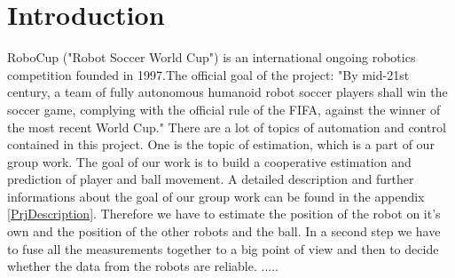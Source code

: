 
\chapter{Introduction}
RoboCup ("Robot Soccer World Cup") is an international ongoing robotics competition founded in 1997.The official goal of the project: "By mid-21st century, a team of fully autonomous humanoid robot soccer players shall win the soccer game, complying with the official rule of the FIFA, against the winner of the most recent World Cup." \cite{wwwRoboCup}
There are a lot of topics of automation and control contained in this project. One is the topic of estimation, which is a part of our group work. The goal of our work is to build a cooperative estimation and prediction of player and ball movement. A detailed description and further informations about the goal of our group work can be found in the appendix \ref{PrjDescription}.
Therefore we have to estimate the position of the robot on it's own and the position of the other robots and the ball. In a second step we have to fuse all the measurements together to a big point of view and then to decide whether the data from the robots are reliable.
.....



